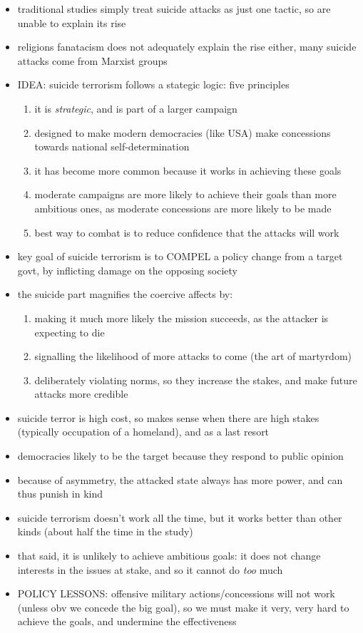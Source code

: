 \documentclass{article}
\begin{document}
\begin{itemize}
    \item traditional studies simply treat suicide attacks as just one tactic, so are unable to explain its rise
    \item religions fanatacism does not adequately explain the rise either, many suicide attacks come from Marxist groups
    \item IDEA: suicide terrorism follows a stategic logic: five principles
    \begin{enumerate}
        \item it is \textit{strategic}, and is part of a larger campaign
        \item designed to make modern democracies (like USA) make concessions towards national self-determination
        \item it has become more common because it works in achieving these goals
        \item moderate campaigns are more likely to achieve their goals than more ambitious ones, as moderate concessions are more likely to be made
        \item best way to combat is to reduce confidence that the attacks will work
    \end{enumerate}
    \item key goal of suicide terrorism is to COMPEL a policy change from a target govt, by inflicting damage on the opposing society
    \item the suicide part magnifies the coercive affects by:
    \begin{enumerate}
        \item making it much more likely the mission succeeds, as the attacker is expecting to die
        \item signalling the likelihood of more attacks to come (the art of martyrdom)
        \item deliberately violating norms, so they increase the stakes, and make future attacks more credible
    \end{enumerate}
    \item suicide terror is high cost, so makes sense when there are high stakes (typically occupation of a homeland), and as a last resort
    \item democracies likely to be the target because they respond to public opinion
    \item because of asymmetry, the attacked state always has more power, and can thus punish in kind
    \item suicide terrorism doesn't work all the time, but it works better than other kinds (about half the time in the study)
    \item that said, it is unlikely to achieve ambitious goals: it does not change interests in the issues at stake, and so it cannot do \textit{too} much
    \item POLICY LESSONS: offensive military actions/concessions will not work (unless obv we concede the big goal), so we must make it very, very hard to achieve the goals, and undermine the effectiveness
\end{itemize}
\end{document}
